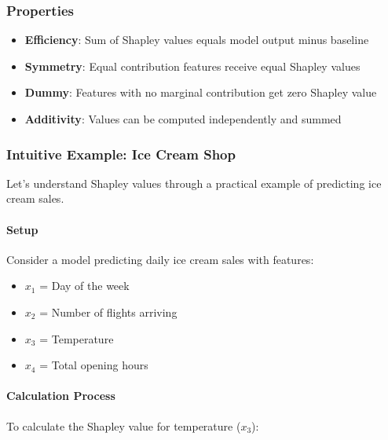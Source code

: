 \documentclass{article}
\begin{document}
\subsubsection{Properties}
\begin{itemize}
    \item \textbf{Efficiency}: Sum of Shapley values equals model output minus baseline
    \item \textbf{Symmetry}: Equal contribution features receive equal Shapley values
    \item \textbf{Dummy}: Features with no marginal contribution get zero Shapley value
    \item \textbf{Additivity}: Values can be computed independently and summed
\end{itemize}

\subsubsection{Intuitive Example: Ice Cream Shop}
Let's understand Shapley values through a practical example of predicting ice cream sales.

\paragraph{Setup}
Consider a model predicting daily ice cream sales with features:
\begin{itemize}
    \item $x_1$ = Day of the week
    \item $x_2$ = Number of flights arriving
    \item $x_3$ = Temperature
    \item $x_4$ = Total opening hours
\end{itemize}

\paragraph{Calculation Process}
To calculate the Shapley value for temperature ($x_3$):
\end{document}
